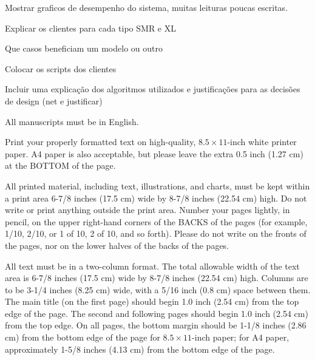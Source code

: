 \documentclass[times, 10pt,two column]{article}
\begin{document}
Mostrar graficos de desempenho do sistema, muitas leituras poucas escritas.

Explicar os clientes para cada tipo SMR e XL

Que casos beneficiam um modelo ou outro

Colocar os scripts dos clientes

Incluir uma explica\c{c}\~ao dos algoritmos utilizados e justifica\c{c}\~oes para as decis\~oes de design (net e justificar)



All manuscripts must be in English.


Print your properly formatted text on high-quality, $8.5 \times 11$-inch 
white printer paper. A4 paper is also acceptable, but please leave the 
extra 0.5 inch (1.27 cm) at the BOTTOM of the page.


All printed material, including text, illustrations, and charts, must be 
kept within a print area 6-7/8 inches (17.5 cm) wide by 8-7/8 inches 
(22.54 cm) high. Do not write or print anything outside the print area. 
Number your pages lightly, in pencil, on the upper right-hand corners of 
the BACKS of the pages (for example, 1/10, 2/10, or 1 of 10, 2 of 10, and 
so forth). Please do not write on the fronts of the pages, nor on the 
lower halves of the backs of the pages.



All text must be in a two-column format. The total allowable width of 
the text area is 6-7/8 inches (17.5 cm) wide by 8-7/8 inches (22.54 cm) 
high. Columns are to be 3-1/4 inches (8.25 cm) wide, with a 5/16 inch 
(0.8 cm) space between them. The main title (on the first page) should 
begin 1.0 inch (2.54 cm) from the top edge of the page. The second and 
following pages should begin 1.0 inch (2.54 cm) from the top edge. On 
all pages, the bottom margin should be 1-1/8 inches (2.86 cm) from the 
bottom edge of the page for $8.5 \times 11$-inch paper; for A4 paper, 
approximately 1-5/8 inches (4.13 cm) from the bottom edge of the page.
\end{document}
